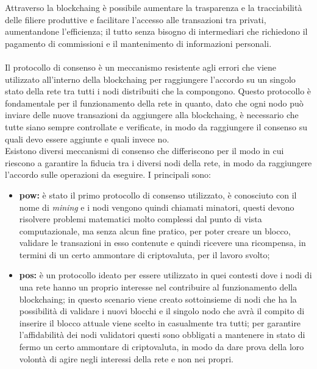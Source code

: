 Attraverso la \gls{blockchaing} è possibile aumentare la trasparenza e la tracciabilità delle filiere produttive e facilitare l'accesso alle transazioni tra privati, aumentandone l'efficienza; il tutto senza bisogno di intermediari che richiedono il pagamento di commissioni e il mantenimento di informazioni personali.
\\\\
Il protocollo di consenso è un meccanismo resistente agli errori che viene utilizzato all'interno della \gls{blockchaing} per raggiungere l'accordo su un singolo stato della rete tra tutti i nodi distribuiti che la compongono. Questo protocollo è fondamentale per il funzionamento della rete in quanto, dato che ogni nodo può inviare delle nuove transazioni da aggiungere alla \gls{blockchaing}, è necessario che tutte siano sempre controllate e verificate, in modo da raggiungere il consenso su quali devo essere aggiunte e quali invece no.\\
Esistono diversi meccanismi di consenso che differiscono per il modo in cui riescono a garantire la fiducia tra i diversi nodi della rete, in modo da raggiungere l'accordo sulle operazioni da eseguire. I principali sono:

\begin{itemize}
	\item \textbf{\gls{pow}:} è stato il primo protocollo di consenso utilizzato, è conosciuto con il nome di \textit{mining} e i nodi vengono quindi chiamati minatori, questi devono risolvere problemi matematici molto complessi dal punto di vista computazionale, ma senza alcun fine pratico, per poter creare un blocco, validare le transazioni in esso contenute e quindi ricevere una ricompensa, in termini di un certo ammontare di criptovaluta, per il lavoro svolto;
	\item \textbf{\gls{pos}:} è un protocollo ideato per essere utilizzato in quei contesti dove i nodi di una rete hanno un proprio interesse nel contribuire al funzionamento della \gls{blockchaing}; in questo scenario viene creato sottoinsieme di nodi che ha la possibilità di validare i nuovi blocchi e il singolo nodo che avrà il compito di inserire il blocco attuale viene scelto in casualmente tra tutti; per garantire l'affidabilità dei nodi validatori questi sono obbligati a mantenere in stato di fermo un certo ammontare di criptovaluta, in modo da dare prova della loro volontà di agire negli interessi della rete e non nei propri.
\end{itemize}

